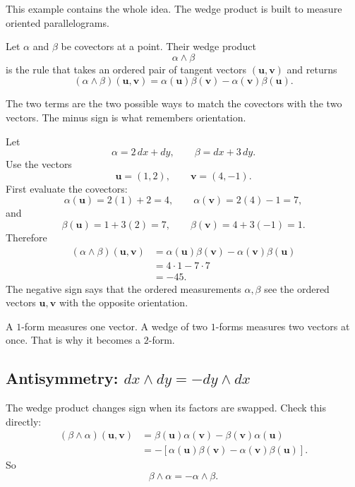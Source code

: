 This example contains the whole idea.  The wedge product is built to measure oriented
parallelograms.

\begin{definition}
Let \(\alpha\) and \(\beta\) be covectors at a point.  Their wedge product
\[
    \alpha\wedge\beta
\]
is the rule that takes an ordered pair of tangent vectors \((\mathbf u,\mathbf v)\) and
returns
\[
\boxed{
    (\alpha\wedge\beta)(\mathbf u,\mathbf v)
    =
    \alpha(\mathbf u)\beta(\mathbf v)
    -
    \alpha(\mathbf v)\beta(\mathbf u).
}
\]
\end{definition}

The two terms are the two possible ways to match the covectors with the two vectors.
The minus sign is what remembers orientation.

\begin{example}
Let
\[
    \alpha=2\,dx+dy,
    \qquad
    \beta=dx+3\,dy.
\]
Use the vectors
\[
    \mathbf u=(1,2),
    \qquad
    \mathbf v=(4,-1).
\]
First evaluate the covectors:
\[
    \alpha(\mathbf u)=2(1)+2=4,
    \qquad
    \alpha(\mathbf v)=2(4)-1=7,
\]
and
\[
    \beta(\mathbf u)=1+3(2)=7,
    \qquad
    \beta(\mathbf v)=4+3(-1)=1.
\]
Therefore
\[
\begin{aligned}
    (\alpha\wedge\beta)(\mathbf u,\mathbf v)
    &=
    \alpha(\mathbf u)\beta(\mathbf v)
    -
    \alpha(\mathbf v)\beta(\mathbf u)\\
    &=
    4\cdot1-7\cdot7\\
    &=
    -45.
\end{aligned}
\]
The negative sign says that the ordered measurements \(\alpha,\beta\) see the ordered
vectors \(\mathbf u,\mathbf v\) with the opposite orientation.
\end{example}

A \(1\)-form measures one vector.  A wedge of two \(1\)-forms measures two vectors at
once.  That is why it becomes a \(2\)-form.

\subsection{\texorpdfstring{Antisymmetry: \(dx\wedge dy=-dy\wedge dx\)}
{Antisymmetry: dx wedge dy = - dy wedge dx}}

The wedge product changes sign when its factors are swapped.  Check this directly:
\[
\begin{aligned}
    (\beta\wedge\alpha)(\mathbf u,\mathbf v)
    &=
    \beta(\mathbf u)\alpha(\mathbf v)
    -
    \beta(\mathbf v)\alpha(\mathbf u)\\
    &=
    -\left[
    \alpha(\mathbf u)\beta(\mathbf v)
    -
    \alpha(\mathbf v)\beta(\mathbf u)
    \right].
\end{aligned}
\]
So
\[
\boxed{
    \beta\wedge\alpha=-\alpha\wedge\beta.
}
\]

